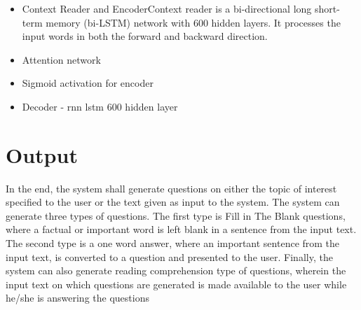 \begin{itemize}

\item Context Reader and EncoderContext reader is a bi-directional long
short-term memory (bi-LSTM) network with 600 hidden layers. It processes the
input words in both the forward and backward direction.

\item Attention network

\item Sigmoid activation for encoder

\item Decoder - rnn lstm 600 hidden layer

\end{itemize}

\section{Output}

In the end, the system shall generate questions on either the topic of interest
specified to the user or the text given as input to the system. The system can
generate three types of questions. The first type is Fill in The Blank
questions, where a factual or important word is left blank in a sentence from
the input text. The second type is a one word answer, where an important
sentence from the input text, is converted to a question and presented to the
user. Finally, the system can also generate reading comprehension type of
questions, wherein the input text on which questions are generated is made
available to the user while he/she is answering the questions

